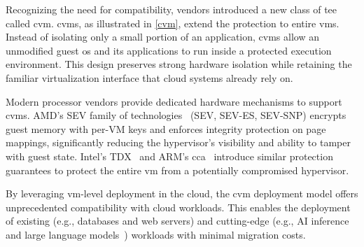 Recognizing the need for compatibility, vendors introduced a new class of \gls{tee} called \gls{cvm}.
\glspl{cvm}, as illustrated in \autoref{cvm}, extend the protection to entire \glspl{vm}.
Instead of isolating only a small portion of an application, \glspl{cvm} allow an unmodified guest \gls{os} and its applications to run inside a protected execution environment.
This design preserves strong hardware isolation while retaining the familiar virtualization interface that cloud systems already rely on.

Modern processor vendors provide dedicated hardware mechanisms to support \glspl{cvm}.
AMD's SEV family of technologies~\cite{advanced_micro_device_sev_2022} (SEV, SEV-ES, SEV-SNP) encrypts guest memory with per-VM keys and enforces integrity protection on page mappings, significantly reducing the hypervisor's visibility and ability to tamper with guest state.
Intel's TDX~\cite{tdx} and ARM's \gls{cca}~\cite{cca} introduce similar protection guarantees to protect the entire \gls{vm} from a potentially compromised hypervisor.


By leveraging \gls{vm}-level deployment in the cloud, the \gls{cvm} deployment model offers unprecedented compatibility with cloud workloads.
This enables the deployment of existing (e.g., databases and web servers) and cutting-edge (e.g., AI inference and large language models~\cite{yifan2025pipellm}) workloads with minimal migration costs.
